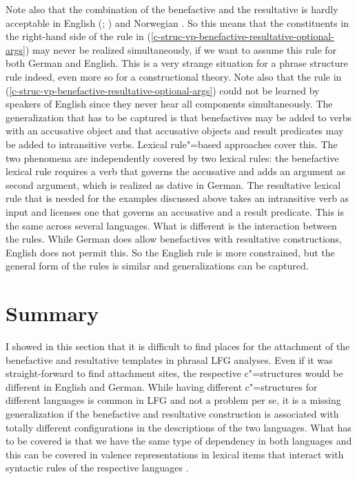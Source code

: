 Note also that the combination of the benefactive and the resultative is hardly acceptable in
English (\citealt[]{BZ90a}; \citealt*[]{BATW2015a}) and Norwegian \citep{Tungseth2007a-u}.
\z
So this means that the constituents in the right-hand side of the rule in
(\ref{c-struc-vp-benefactive-resultative-optional-args}) may never be realized simultaneously, if we
want to assume this rule for both German and English. This is a
very strange situation for a phrase structure rule indeed, even more so for a constructional
theory. Note also that the rule in (\ref{c-struc-vp-benefactive-resultative-optional-args}) could
not be learned by speakers of English since they never hear all components simultaneously.
The generalization that has to be captured is that benefactives may be added to verbs with
an accusative object and that accusative objects and result predicates may be added to intransitive
verbs. Lexical rule"=based approaches cover this. The two phenomena are independently covered by two
lexical rules: the benefactive lexical rule requires a verb that governs the accusative and adds an
argument as second argument, which is realized as dative in German. The resultative lexical rule
that is needed for the examples discussed above takes an intransitive verb as input and licenses one
that governs an accusative and a result predicate. This is the same across several languages. What is
different is the interaction between the rules. While German does allow benefactives with
resultative constructions, English does not permit this. So the English rule is more constrained, but
the general form of the rules is similar and generalizations can be captured.


\section{Summary}

I showed in this section that it is difficult to find places for the attachment of the benefactive
and resultative templates in phrasal LFG analyses. Even if it was straight-forward to find
attachment sites, the respective c"=structures would be different in English and German. While
having different c"=structures for different languages is common in LFG and not a problem per se, it
is a missing generalization if the benefactive and resultative construction is associated with
totally different configurations in the descriptions of the two languages. What has to be covered is
that we have the same type of dependency in both languages and this can be covered in valence
representations in lexical items that interact with syntactic rules of the respective languages \citep{MuellerLexikon}.

